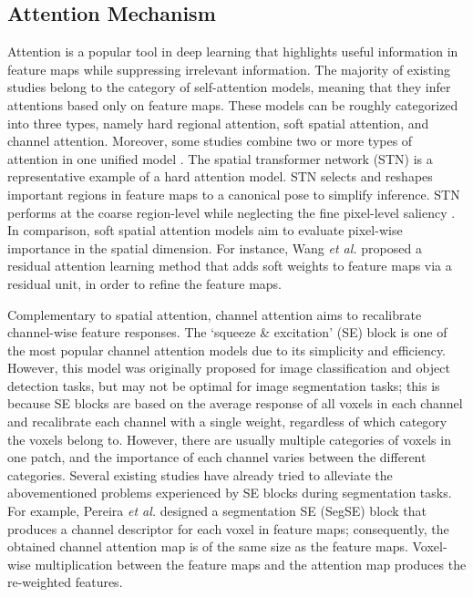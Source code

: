 \documentclass[journal,twoside]{IEEEtran}
\begin{document}
\subsection{Attention Mechanism}
Attention is a popular tool in deep learning that highlights useful information in feature maps while suppressing irrelevant information. The majority of existing studies \cite{Hu_2018_CVPR,jaderberg2015spatial,li2018harmonious,wang2017residual,roy2018concurrent,pereira2018adaptive,zhu2019attention} belong to the category of self-attention models, meaning that they infer attentions based only on feature maps. These models can be roughly categorized into three types, namely hard regional attention, soft spatial attention, and channel attention. Moreover, some studies combine two or more types of attention in one unified model \cite{roy2018concurrent,wang2017residual,li2018harmonious}. The spatial transformer network (STN) \cite{jaderberg2015spatial} is a representative example of a hard attention model. STN selects and reshapes important regions in feature maps to a canonical pose to simplify inference. STN performs at the coarse region-level while neglecting the fine pixel-level saliency \cite{li2018harmonious}. In comparison, soft spatial attention models aim to evaluate pixel-wise importance in the spatial dimension. For instance, Wang \emph{et al.} \cite{wang2017residual} proposed a residual attention learning method that adds soft weights to feature maps via a residual unit, in order to refine the feature maps. 



Complementary to spatial attention, channel attention aims to recalibrate channel-wise feature responses. The `squeeze \& excitation' (SE) block \cite{Hu_2018_CVPR} is one of the most popular channel attention models due to its simplicity and efficiency. However, this model was originally proposed for image classification and object detection tasks, but may not be optimal for image segmentation tasks; this is because SE blocks are based on the average response of all voxels in each channel and recalibrate each channel with a single weight, regardless of which category the voxels belong to. However, there are usually multiple categories of voxels in one patch, and the importance of each channel varies between the different categories. Several existing studies have already tried to alleviate the abovementioned problems experienced by SE blocks during segmentation tasks. For example, Pereira \emph{et al.} \cite{pereira2018adaptive} designed a segmentation SE (SegSE) block that produces a channel descriptor for each voxel in feature maps; consequently, the obtained channel attention map is of the same size as the feature maps. Voxel-wise multiplication between the feature maps and the attention map produces the re-weighted features. 
\end{document}
